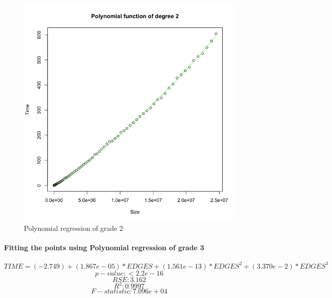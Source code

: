 \documentclass{article}
\begin{document}
\begin{figure}[H]
\centering
\includegraphics[width=\linewidth]{Rplot4.png}
\caption{Polynomial regression of grade 2}
\end{figure}



\paragraph{Fitting the points using Polynomial regression of grade 3}
$$ TIME = (-2.749) + (1.867e-05)*EDGES  +(1.561e-13)*EDGES^{2} + (3.370e-2)*EDGES^{3}$$
$$ p-value: < 2.2e-16 $$
$$ RSE: 3.162 $$
$$ R^{2}:  0.9997 $$
$$ F-statistic: 7.096e+04$$
\end{document}
